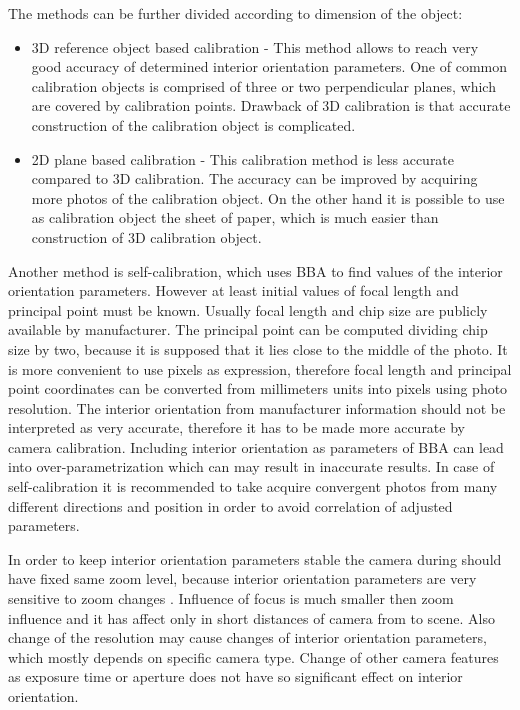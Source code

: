 \documentclass[a4paper,12pt]{article}
\begin{document}
The methods can be further divided according to dimension of the object:
\begin{itemize}
\item 3D reference object based calibration - This method allows to reach very good accuracy of determined 
interior orientation parameters. One of common calibration objects is comprised of three or two
perpendicular planes, which are covered by calibration points. Drawback of 3D calibration 
is that accurate construction of the calibration object is complicated.
\item 2D plane based calibration - This calibration method is less accurate compared to 3D calibration. 
The accuracy can be improved by acquiring more photos of the calibration object.
On the other hand it is possible to use as calibration object the sheet of paper, which is much 
easier than construction of 3D calibration object.
\end{itemize}


Another method is self-calibration, which uses BBA to find values of the interior orientation parameters.
However at least initial values of focal length and principal point must be known.
Usually focal length and chip size are publicly available by manufacturer. The principal point 
can be computed dividing chip size by two, because it is supposed that it lies close to 
the middle of the photo.
It is more convenient to use 
pixels as expression, therefore focal length and principal point coordinates can be 
converted from millimeters units into pixels using photo resolution. 
The interior orientation from manufacturer information should not be interpreted as very accurate, therefore 
it has  to be made more accurate by camera calibration.
Including interior orientation as parameters of BBA
can lead into over-parametrization which can may result in inaccurate results.
In case of self-calibration it is recommended to take acquire convergent photos from many different directions and position in order
to avoid correlation of adjusted parameters. 

In order to keep interior orientation parameters stable the camera during should have fixed same zoom level,
because interior orientation parameters are very sensitive  to zoom changes \cite{labe2004geometric}.
Influence of focus is  much smaller then zoom influence and it has affect only in short distances of camera
from to scene.
Also change of the resolution may cause changes of interior orientation parameters, which mostly depends 
on specific camera type. 
Change of other camera features as exposure time or aperture does not have so significant effect on interior
orientation.
\end{document}
